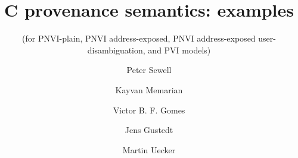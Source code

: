 \documentclass[acmsmall,review,screen]{acmart}\settopmatter{printfolios=true,printccs=false,printacmref=false}
\newif\ifWGfourteennumber
\begin{document}
\makeatletter
\ifWGfourteennumber
\fancypagestyle{firstpagestyle}{%
\fancyhf{} %
\fancyhead[LO]{\ACM@linecountL}%
\fancyhead[C]{ISO/IEC JTC1/SC22/WG14 Nxxxx, 2019-03-xx} %
\renewcommand{\headrulewidth}{0pt}
\renewcommand{\footrulewidth}{0pt}}
\fi
\makeatother

\title[C provenance semantics: examples]{C provenance semantics: examples}
\subtitle{(for PNVI-plain, PNVI address-exposed, PNVI address-exposed 
user-disambiguation, and PVI models)}


\authorsaddresses{}



\author{Peter Sewell}



 \author{Kayvan Memarian}
% 
% 

 \author{Victor B. F. Gomes}

 \author{Jens Gustedt}

 \author{Martin Uecker}

 
\renewcommand{\shortauthors}{Sewell, Memarian, Gomes, Gustedt, Uecker}
\end{document}

